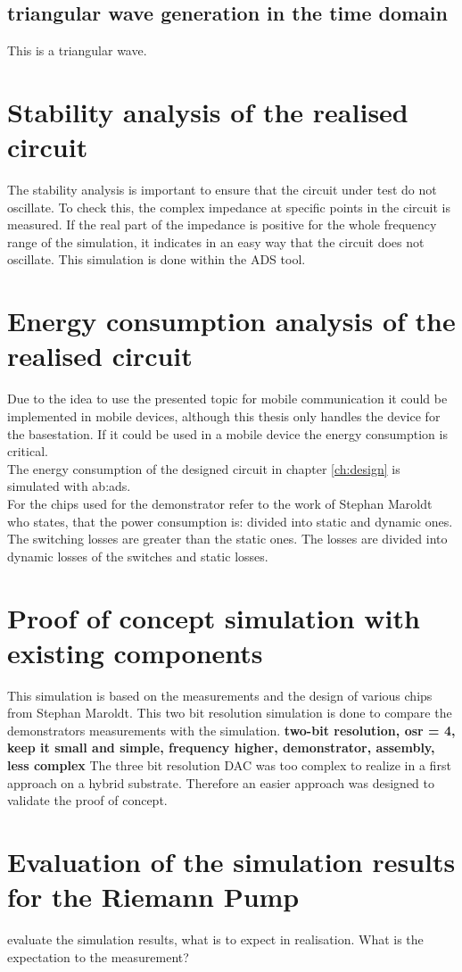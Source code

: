 \subsection{triangular wave generation in the time domain}
This is a triangular wave.


\section{Stability analysis of the realised circuit}
The stability analysis is important to ensure that the circuit under test do not oscillate. 
 To check this, the complex impedance at specific points in the circuit is measured.
 If the real part of the impedance is positive for the whole frequency range of the simulation, it indicates in an easy way that the circuit does not oscillate.
This simulation is done within the ADS tool. 

\section{Energy consumption analysis of the realised circuit}
Due to the idea to use the presented topic for mobile communication it could be implemented in mobile devices, although this thesis only handles the device for the basestation. If it could be used in a mobile device the energy consumption is critical.\\
The energy consumption of the designed circuit in chapter \ref{ch:design} is simulated with \gls{ab:ads}.\\
 For the chips used for the demonstrator refer to the work of Stephan Maroldt who states, that the power consumption is:  divided into static and dynamic ones. The switching losses are greater than the static ones.
The losses are divided into dynamic losses of the switches and static losses.

\section{Proof of concept simulation with existing components}
This simulation is based on the measurements and the design of various chips from Stephan Maroldt.
This two bit resolution simulation is done to compare the demonstrators measurements with the simulation. \textbf{two-bit resolution, osr = 4, keep it small and simple, frequency higher, demonstrator, assembly, less complex} 
The three bit resolution DAC was too complex to realize in a first approach on a hybrid substrate. Therefore an easier approach was designed to validate the proof of concept.

\section{Evaluation of the simulation results for the Riemann Pump}
evaluate the simulation results, what is to expect in realisation. 
What is the expectation to the measurement?
